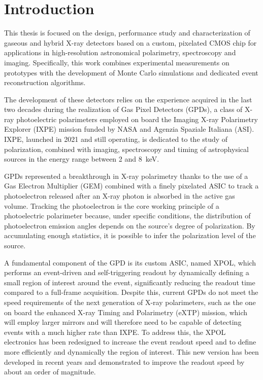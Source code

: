 \chapter{Introduction}
\label{chap:chapter1}

This thesis is focused on the design, performance study and characterization of gaseous and hybrid X-ray detectors based on a custom, pixelated CMOS chip for applications in high-resolution astronomical polarimetry, spectroscopy and imaging. Specifically, this work combines experimental measurements on prototypes with the development of Monte Carlo simulations and dedicated event reconstruction algorithms.

The development of these detectors relies on the experience acquired in the last two decades during the realization of Gas Pixel Detectors (GPDs), a class of X-ray photoelectric polarimeters employed on board the Imaging X-ray Polarimetry Explorer (IXPE) mission funded by NASA and Agenzia Spaziale Italiana (ASI). IXPE, launched in 2021 and still operating, is dedicated to the study of polarization, combined with imaging, spectroscopy and timing of astrophysical sources in the energy range between 2 and 8~keV.

GPDs represented a breakthrough in X-ray polarimetry thanks to the use of a Gas Electron Multiplier (GEM) combined with a finely pixelated ASIC to track a photoelectron released after an X-ray photon is absorbed in the active gas volume. Tracking the photoelectron is the core working principle of a photoelectric polarimeter because, under specific conditions, the distribution of photoelectron emission angles depends on the source's degree of polarization. By accumulating enough statistics, it is possible to infer the polarization level of the source.

A fundamental component of the GPD is its custom ASIC, named XPOL, which performs an event-driven and self-triggering readout by dynamically defining a small region of interest around the event, significantly reducing the readout time compared to a full-frame acquisition. Despite this, current GPDs do not meet the speed requirements of the next generation of X-ray polarimeters, such as the one on board the enhanced X-ray Timing and Polarimetry (eXTP) mission, which will employ larger mirrors and will therefore need to be capable of detecting events with a much higher rate than IXPE. To address this, the XPOL electronics has been redesigned to increase the event readout speed and to define more efficiently and dynamically the region of interest. This new version has been developed in recent years and demonstrated to improve the readout speed by about an order of magnitude.

